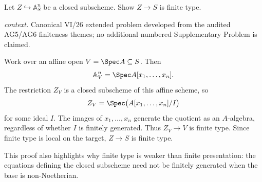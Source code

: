 \begin{problem}\label{prob:vi26-p11}
Let \(Z\hookrightarrow\mathbb A^n_S\) be a closed subscheme.  Show \(Z\to S\) is finite type.
\par\smallskip\noindent\textit{context.} Canonical VI/26 extended problem developed from the audited AG5/AG6 finiteness themes; no additional numbered Supplementary Problem is claimed.
\end{problem}

\ifdefined\FullProblemDossiers
\begin{solution}
Work over an affine open \(V=\Spec A\subseteq S\).  Then
\[
\mathbb A^n_V=\Spec A[x_1,\ldots,x_n].
\]
The restriction \(Z_V\) is a closed subscheme of this affine scheme, so
\[
Z_V=\Spec\bigl(A[x_1,\ldots,x_n]/I\bigr)
\]
for some ideal \(I\).  The images of \(x_1,\ldots,x_n\) generate the quotient as an \(A\)-algebra,
regardless of whether \(I\) is finitely generated.  Thus \(Z_V\to V\) is finite type.  Since finite
type is local on the target, \(Z\to S\) is finite type.

This proof also highlights why finite type is weaker than finite presentation: the equations defining
the closed subscheme need not be finitely generated when the base is non-Noetherian.
\end{solution}
\fi
